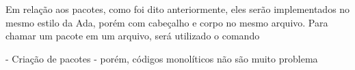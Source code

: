 Em relação aos pacotes, como foi dito anteriormente, eles serão implementados
no mesmo estilo da Ada, porém com cabeçalho e corpo no mesmo arquivo. Para
chamar um pacote em um arquivo, será utilizado o comando 

- Criação de pacotes - porém, códigos monolíticos não são muito problema
